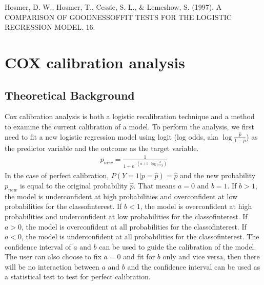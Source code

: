 \documentclass[letterpaper,10pt,english]{sphinxmanual}
\begin{document}
\sphinxAtStartPar
Hosmer, D. W., Hosmer, T., Cessie, S. L., \& Lemeshow, S. (1997). A COMPARISON OF GOODNESS\sphinxhyphen{}OF\sphinxhyphen{}FIT TESTS FOR THE LOGISTIC REGRESSION MODEL. 16.

\sphinxstepscope


\chapter{COX calibration analysis}
\label{\detokenize{notebooks/cox:COX-calibration-analysis}}\label{\detokenize{notebooks/cox::doc}}

\section{Theoretical Background}
\label{\detokenize{notebooks/cox:Theoretical-Background}}
\sphinxAtStartPar
Cox calibration analysis is both a logistic recalibration technique and a method to examine the current calibration of a model. To perform the analysis, we first need to fit a new logistic regression model using logit (log odds, aka \(\log\frac{\hat{p}}{1-\hat{p}}\)) as the predictor variable and the outcome as the target variable.
\begin{equation*}
\begin{split}p_{new} = \frac{1}{1+e^{-(a + b \cdot \log\frac{\hat{p}}{1-\hat{p}})}}\end{split}
\end{equation*}
\sphinxAtStartPar
In the case of perfect calibration, \(P(Y=1|p=\hat{p}) = \hat{p}\) and the new probability \(p_{new}\) is equal to the original probability \(\hat{p}\). That means \(a=0\) and \(b=1\). If \(b>1\), the model is under\sphinxhyphen{}confident at high probabilities and over\sphinxhyphen{}confident at low probabilities for the class\sphinxhyphen{}of\sphinxhyphen{}interest. If \(b<1\), the model is over\sphinxhyphen{}confident at high probabilities and under\sphinxhyphen{}confident at low probabilities for the class\sphinxhyphen{}of\sphinxhyphen{}interest. If \(a>0\), the model
is over\sphinxhyphen{}confident at all probabilities for the class\sphinxhyphen{}of\sphinxhyphen{}interest. If \(a<0\), the model is under\sphinxhyphen{}confident at all probabilities for the class\sphinxhyphen{}of\sphinxhyphen{}interest. The confidence interval of \(a\) and \(b\) can be used to guide the calibration of the model. The user can also choose to fix \(a=0\) and fit for \(b\) only and vice versa, then there will be no interaction between \(a\) and \(b\) and the confidence interval can be used as a statistical test to test for perfect
calibration.
\end{document}
